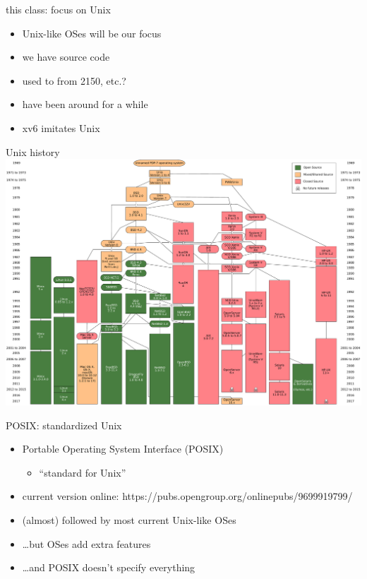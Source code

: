 \usetikzlibrary{calc}

\begin{frame}{this class: focus on Unix}
    \begin{itemize}
    \item Unix-like OSes will be our focus
    \item we have source code
    \item used to from 2150, etc.?
    \item have been around for a while
    \item xv6 imitates Unix
    \end{itemize}
\end{frame}

\begin{frame}{Unix history}
\vspace{-.5cm}
\includegraphics[height=0.9\textheight]{../unix-api/Unix_history-simple_en.pdf}
\end{frame}

\begin{frame}{POSIX: standardized Unix}
\begin{itemize}
\item Portable Operating System Interface (POSIX) 
    \begin{itemize}
    \item ``standard for Unix''
    \end{itemize}
\item current version online: https://pubs.opengroup.org/onlinepubs/9699919799/
\item (almost) followed by most current Unix-like OSes
\item \ldots but OSes add extra features
\item \ldots and POSIX doesn't specify everything
\end{itemize}
\end{frame}

